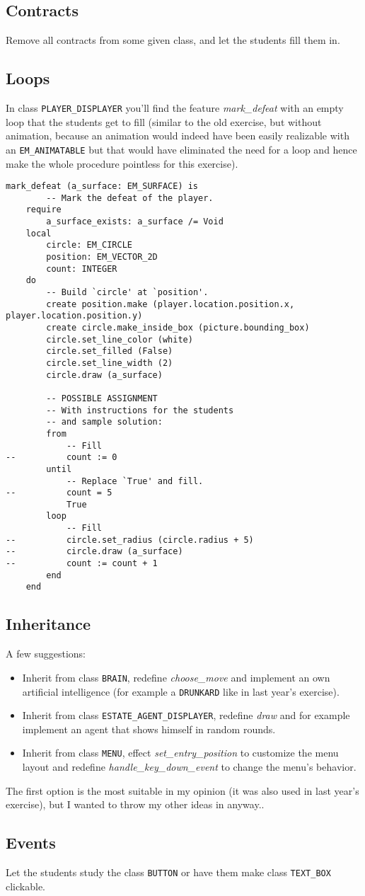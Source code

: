 \subsection{Contracts}
Remove all contracts from some given class, and let the students fill them in.

\subsection{Loops}
In class \texttt{PLAYER\_DISPLAYER} you'll find the feature \textit{mark\_defeat} with an empty loop that the students get to fill (similar to the old exercise, but without animation, because an animation would indeed have been easily realizable with an \texttt{EM\_ANIMATABLE} but that would have eliminated the need for a loop and hence make the whole procedure pointless for this exercise).

\begin{lstlisting}
mark_defeat (a_surface: EM_SURFACE) is  
		-- Mark the defeat of the player.
	require
		a_surface_exists: a_surface /= Void
	local
		circle: EM_CIRCLE
		position: EM_VECTOR_2D
		count: INTEGER
	do
		-- Build `circle' at `position'.
		create position.make (player.location.position.x, player.location.position.y)
		create circle.make_inside_box (picture.bounding_box)
		circle.set_line_color (white)
		circle.set_filled (False)
		circle.set_line_width (2)
		circle.draw (a_surface)

		-- POSSIBLE ASSIGNMENT
		-- With instructions for the students
		-- and sample solution:
		from
			-- Fill
--			count := 0
		until
			-- Replace `True' and fill.
--			count = 5
			True				
		loop
			-- Fill
--			circle.set_radius (circle.radius + 5)
--			circle.draw (a_surface)
--			count := count + 1
		end
	end  
\end{lstlisting}

\subsection{Inheritance}
A few suggestions:

\begin{itemize}
  \item Inherit from class \texttt{BRAIN}, redefine \textit{choose\_move} and implement an own artificial intelligence (for example a \texttt{DRUNKARD} like in last year's exercise). 
  \item Inherit from class \texttt{ESTATE\_AGENT\_DISPLAYER}, redefine \textit{draw} and for example implement an agent that shows himself in random rounds.
  \item Inherit from class \texttt{MENU}, effect \textit{set\_entry\_position} to customize the menu layout and redefine \textit{handle\_key\_down\_event} to change the menu's behavior.
\end{itemize}
The first option is the most suitable in my opinion (it was also used in last year's exercise), but I wanted to throw my other ideas in anyway..

\subsection{Events}
Let the students study the class \texttt{BUTTON} or have them make class \texttt{TEXT\_BOX} clickable.

